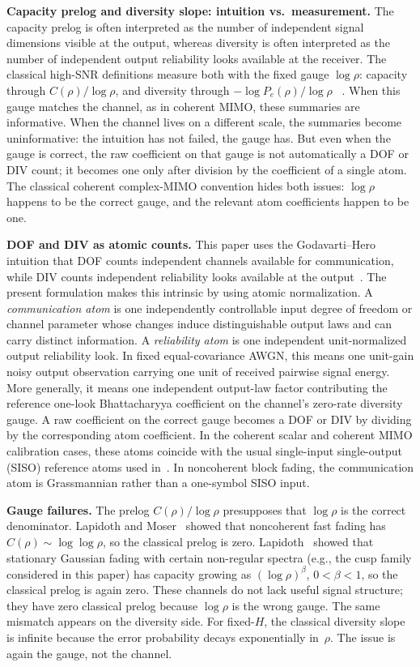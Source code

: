 \documentclass[lettersize,onecolumn]{IEEEtran}
\newcommand{\snr}{\rho}
\begin{document}
\textbf{Capacity prelog and diversity slope: intuition vs.\ measurement.}
The capacity prelog is often interpreted as the number of independent
signal dimensions visible at the output, whereas diversity is often
interpreted as the number of independent output reliability looks
available at the receiver. The classical
high-SNR definitions measure both with the fixed gauge $\log\snr$:
capacity through $C(\snr)/\log\snr$, and diversity through
$-\log P_e(\snr)/\log\snr$%
~\cite{ZhengTse2003,TarokhSeshadriCalderbank1998}.
When this gauge matches the channel, as in coherent MIMO, these
summaries are informative. When the channel lives on a different
scale, the summaries become uninformative: the intuition has not
failed, the gauge has. But even when the gauge is correct, the raw
coefficient on that gauge is not automatically a DOF or DIV count;
it becomes one only after division by the coefficient of a single
atom. The classical coherent complex-MIMO convention hides
both issues: $\log\snr$ happens to be the correct gauge, and the
relevant atom coefficients happen to be one.

\textbf{DOF and DIV as atomic counts.}
This paper uses the Godavarti--Hero intuition that DOF counts
independent channels available for communication, while DIV counts
independent reliability looks available at the
output~\cite{GodavartiHero2002}. The present formulation makes this
intrinsic by using atomic normalization. A \emph{communication atom}
is one independently controllable input degree of freedom or channel
parameter whose changes induce distinguishable output laws and can
carry distinct information. A \emph{reliability atom} is one
independent unit-normalized output reliability look. In fixed
equal-covariance AWGN, this means one unit-gain noisy output
observation carrying one unit of received pairwise signal energy.
More generally, it means one independent output-law factor
contributing the reference one-look Bhattacharyya coefficient on the
channel's zero-rate diversity gauge. A raw coefficient on the correct
gauge becomes a DOF or DIV by dividing by the corresponding atom
coefficient. In the coherent scalar and coherent MIMO calibration
cases, these atoms coincide with the usual single-input single-output
(SISO) reference atoms used in~\cite{GodavartiHero2002}. In
noncoherent block fading, the communication atom is Grassmannian
rather than a one-symbol SISO input.

\textbf{Gauge failures.}
The prelog $C(\snr)/\log\snr$ presupposes that $\log\snr$ is the
correct denominator.
Lapidoth and Moser~\cite{LapidothMoser2003} showed that noncoherent
fast fading has $C(\snr) \sim \log\log\snr$, so the classical prelog
is zero.
Lapidoth~\cite{Lapidoth2005} showed that stationary Gaussian fading
with certain non-regular spectra (e.g., the cusp family considered in
this paper) has capacity growing as $(\log\snr)^\beta$,
$0 < \beta < 1$, so the classical prelog is again zero. These
channels do not lack useful signal structure; they have zero
classical prelog because $\log\snr$ is the wrong gauge.
The same mismatch appears on the diversity side. For fixed-$H$, the
classical diversity slope is infinite because the error probability
decays exponentially in~$\snr$. The issue is again the gauge, not the
channel.
\end{document}

